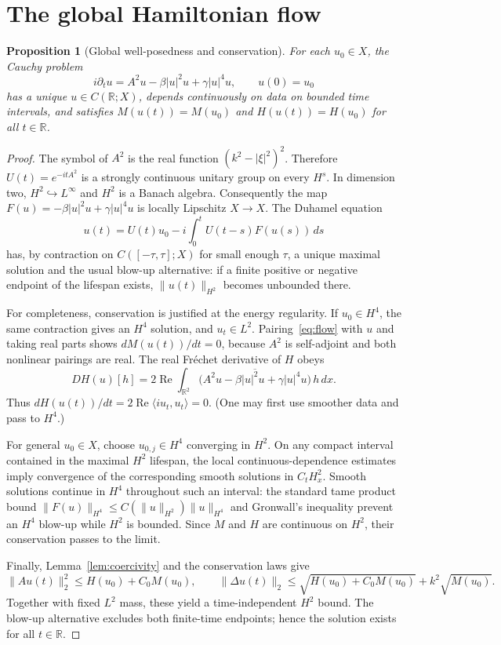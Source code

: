 \documentclass[11pt]{article}
\newtheorem{proposition}[theorem]{Proposition}
\newcommand{\RR}{\mathbb R}
\newcommand{\nm}[2]{\lVert #1\rVert_{#2}}
\begin{document}
\section{The global Hamiltonian flow}
\begin{proposition}[Global well-posedness and conservation]\label{prop:global}
For each \(u_0\in X\), the Cauchy problem
\begin{equation}\label{eq:flow}
i\partial_tu=A^2u-\beta |u|^2u+\gamma|u|^4u,
\qquad u(0)=u_0
\end{equation}
has a unique \(u\in C(\RR;X)\), depends continuously on data on
bounded time intervals, and satisfies
\(M(u(t))=M(u_0)\) and \(H(u(t))=H(u_0)\)
for all \(t\in\RR\).
\end{proposition}
\begin{proof}
The symbol of \(A^2\) is the real function
\((k^2-|\xi|^2)^2\). Therefore
\(U(t)=e^{-itA^2}\) is a strongly continuous unitary group on every
\(H^s\). In dimension two, \(H^2\hookrightarrow L^\infty\) and
\(H^2\) is a Banach algebra. Consequently the map
\(F(u)=-\beta|u|^2u+\gamma|u|^4u\) is locally Lipschitz
\(X\to X\). The Duhamel equation
\[
u(t)=U(t)u_0-i\int_0^t U(t-s)F(u(s))\,ds
\]
has, by contraction on \(C([-\tau,\tau];X)\) for small enough
\(\tau\), a unique maximal solution and the usual blow-up alternative:
if a finite positive or negative endpoint of the lifespan exists,
\(\nm{u(t)}{H^2}\) becomes unbounded there.

For completeness, conservation is justified at the energy regularity.
If \(u_0\in H^4\), the same contraction gives an \(H^4\) solution,
and \(u_t\in L^2\). Pairing~\eqref{eq:flow} with \(u\) and taking real
parts shows \(dM(u(t))/dt=0\), because \(A^2\) is self-adjoint and
both nonlinear pairings are real. The real Fr\'echet derivative of \(H\)
obeys
\[
DH(u)[h]=2\operatorname{Re}\int_{\RR^2}
\overline{\big(A^2u-\beta|u|^2u+\gamma|u|^4u\big)}\,h\,dx.
\]
Thus \(dH(u(t))/dt=2\operatorname{Re}\langle i u_t,u_t\rangle=0\).
(One may first use smoother data and pass to \(H^4\).)

For general \(u_0\in X\), choose \(u_{0,j}\in H^4\) converging in
\(H^2\). On any compact interval contained in the maximal \(H^2\)
lifespan, the local continuous-dependence estimates imply convergence
of the corresponding smooth solutions in \(C_tH^2_x\). Smooth solutions
continue in \(H^4\) throughout such an interval: the standard tame
product bound
\(\nm{F(u)}{H^4}\le C(\nm{u}{H^2})\nm{u}{H^4}\)
and Gronwall's inequality prevent an \(H^4\) blow-up while \(H^2\)
is bounded. Since \(M\) and \(H\) are continuous on \(H^2\), their
conservation passes to the limit.

Finally, Lemma~\ref{lem:coercivity} and the conservation laws give
\[
\nm{Au(t)}{2}^2\le H(u_0)+C_0M(u_0),\qquad
\nm{\Delta u(t)}{2}\le
\sqrt{H(u_0)+C_0M(u_0)}+k^2\sqrt{M(u_0)}.
\]
Together with fixed \(L^2\) mass, these yield a time-independent
\(H^2\) bound. The blow-up alternative excludes both finite-time
endpoints; hence the solution exists for all \(t\in\RR\).
\end{proof}
\end{document}
